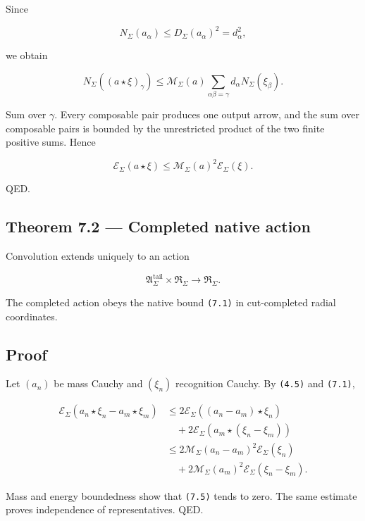 Since

\[
N_\Sigma(a_\alpha)
\le D_\Sigma(a_\alpha)^2=d_\alpha^2,
\]

we obtain

\[
N_\Sigma((a\star\xi)_\gamma)
\le
\mathcal M_\Sigma(a)
\sum_{\alpha\beta=\gamma}
 d_\alpha N_\Sigma(\xi_\beta).
\tag{7.3}
\]

Sum over \(\gamma\). Every composable pair produces one output arrow, and the
sum over composable pairs is bounded by the unrestricted product of the two
finite positive sums. Hence

\[
\mathcal E_\Sigma(a\star\xi)
\le
\mathcal M_\Sigma(a)^2\mathcal E_\Sigma(\xi).
\]

QED.

\hypertarget{theorem-7.2-completed-native-action}{%
\subsection{Theorem 7.2 --- Completed native action}\label{theorem-7.2-completed-native-action}}

Convolution extends uniquely to an action

\[
\boxed{
\mathfrak A_\Sigma^{\mathrm{tail}}
\times
\mathfrak R_\Sigma
\longrightarrow
\mathfrak R_\Sigma.
}
\tag{7.4}
\]

The completed action obeys the native bound \texttt{(7.1)} in cut-completed radial
coordinates.

\hypertarget{proof-8}{%
\subsection{Proof}\label{proof-8}}

Let \((a_n)\) be mass Cauchy and \((\xi_n)\) recognition Cauchy. By \texttt{(4.5)}
and \texttt{(7.1)},

\[
\begin{aligned}
\mathcal E_\Sigma(a_n\star\xi_n-a_m\star\xi_m)
&\le
2\mathcal E_\Sigma((a_n-a_m)\star\xi_n)\\
&\quad+
2\mathcal E_\Sigma(a_m\star(\xi_n-\xi_m))\\
&\le
2\mathcal M_\Sigma(a_n-a_m)^2
  \mathcal E_\Sigma(\xi_n)\\
&\quad+
2\mathcal M_\Sigma(a_m)^2
  \mathcal E_\Sigma(\xi_n-\xi_m).
\end{aligned}
\tag{7.5}
\]

Mass and energy boundedness show that \texttt{(7.5)} tends to zero. The same estimate
proves independence of representatives. QED.

